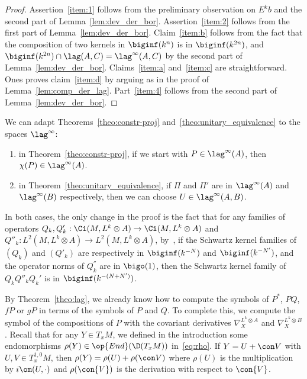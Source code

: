 \begin{proof}
Assertion~\ref{item:1} follows from the preliminary
observation on $E^kb$ and the second part of Lemma~\ref{lem:dev_der_bor}. Assertion~\ref{item:2} follows from the first part of Lemma~\ref{lem:dev_der_bor}. Claim~\ref{item:b} follows from the fact that the composition of two kernels in $\biginf (k^{n})$ is in $\biginf (k^{2n})$, and $\biginf (k^{2n}) \cap \lag (A,C) = \lag^{\infty} (A,C)$ by the second part of Lemma~\ref{lem:dev_der_bor}. Claims~\ref{item:a} and~\ref{item:c} are straightforward. Ones proves claim~\ref{item:d} by arguing as in the proof of Lemma~\ref{lem:comp_der_lag}. Part~\ref{item:4} follows from the second part of Lemma~\ref{lem:dev_der_bor}.
\end{proof}

\begin{rema} \label{sec:rem_linfty}
We can adapt Theorems~\ref{theo:constr-proj} and~\ref{theo:unitary_equivalence} to the spaces $\lag^{\infty}$:
\begin{enumerate}
\item in Theorem~\ref{theo:constr-proj}, if we start with $P \in \lag^{\infty} (A)$, then $\chi (P) \in \lag ^{\infty} (A)$.
\item in Theorem~\ref{theo:unitary_equivalence}, if $\Pi$ and $\Pi'$ are in $\lag^{\infty} (A)$ and $\lag^{\infty} (B)$ respectively, then we can choose $U \in \lag^{\infty} (A,B)$.
\end{enumerate}
In both cases, the only change in the proof is the fact that for any families of operators $Q_k, Q'_k : \Ci (M,L^k \otimes A) \rightarrow \Ci (M, L^k\otimes A)$ and $Q''_k : L^2 (M, L^k
\otimes A) \rightarrow L^2 (M, L^k \otimes A)$, by~\cite[Section~4.3]{oim}, if the Schwartz kernel families of $(Q_k)$ and $(Q'_k)$ are respectively in $\biginf (k^{-N})$ and $\biginf (k^{-N'})$, and the operator norms of $Q_k^{''}$ are in $\bigo (1)$, then the Schwartz kernel family of $Q_k Q''_k Q_k'$ is in $\biginf (k^{-(N +N')})$.
\end{rema}

By Theorem~\ref{theo:lag}, we already know how to compute the symbols of $P^*$, $PQ$, $f P$ or $gP$ in terms of the symbols of $P$ and $Q$. To complete this, we compute the symbol of the compositions of $P$ with the covariant derivatives $\nabla_X^{L^k \otimes A}$ and $\nabla_X^{L^k \otimes B}$. Recall that for any $Y \in T_xM$, we defined in the introduction some endomorphisms $\rho (Y) \in \op{End} (\D (T_xM))$ in~\eqref{eq:rho}. If $Y = U + \con V$ with $U, V \in T_x ^{1,0} M$, then $\rho (Y)=
\rho (U) + \rho (\con V)$ where $\rho(U)$ is the multiplication by $i \om (U, \cdot)$ and $\rho (\con{V})$ is the derivation with respect to $\con{V}$.


